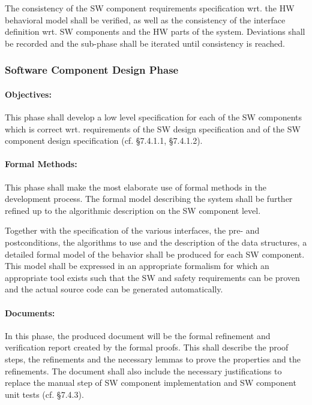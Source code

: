The consistency of the SW component requirements specification wrt. the HW
behavioral model shall be verified, as well as the consistency of the interface
definition wrt. SW components and the HW parts of the system. Deviations shall
be recorded and the sub-phase shall be iterated until consistency is reached.


\subsubsection{Software Component Design Phase}
\label{sec:softw-comp-design}

\paragraph{Objectives:}
\label{sec:sw-comp-objectives}
This phase shall develop a low level specification for each of the SW components
which is correct wrt. requirements of the SW design specification and of the SW
component design specification (cf. §7.4.1.1, §7.4.1.2).

\paragraph{Formal Methods:}
\label{sec:sw-comp-formal-methods}
This phase shall make the most elaborate use of formal methods in the
development process. The formal model describing the system shall be further
refined up to the algorithmic description on the SW component level.

Together with the specification of the various interfaces, the pre- and
postconditions, the algorithms to use and the description of the data
structures, a detailed formal model of the behavior shall be produced for each
SW component. This model shall be expressed in an appropriate formalism for
which an appropriate tool exists such that the SW and safety requirements can be
proven and the actual source code can be generated automatically.

\paragraph{Documents:}
\label{sec:sw-comp-documents}
In this phase, the produced document will be the formal refinement and
verification report created by the formal proofs. This shall describe the proof
steps, the refinements and the necessary lemmas to prove the properties and the
refinements. The document shall also include the necessary justifications to
replace the manual step of SW component implementation and SW component unit
tests (cf. §7.4.3).

